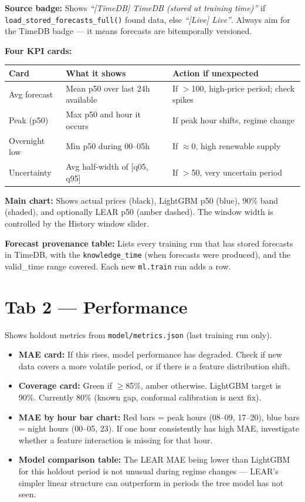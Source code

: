 \documentclass[12pt, a4paper, oneside]{memoir}
\newcommand{\code}[1]{\texttt{\footnotesize #1}}
\begin{document}
\textbf{Source badge:} Shows \emph{``[TimeDB] TimeDB (stored at training time)''} if
\code{load\_stored\_forecasts\_full()} found data, else \emph{``[Live] Live''}. Always aim
for the TimeDB badge --- it means forecasts are bitemporally versioned.

\textbf{Four KPI cards:}
\begin{center}
\begin{tabular}{lll}
\toprule
\textbf{Card} & \textbf{What it shows} & \textbf{Action if unexpected} \\
\midrule
Avg forecast   & Mean p50 over last 24h available & If $>$100, high-price period; check spikes \\
Peak (p50)     & Max p50 and hour it occurs      & If peak hour shifts, regime change \\
Overnight low  & Min p50 during 00--05h          & If $\approx$0, high renewable supply \\
Uncertainty    & Avg half-width of [q05, q95]    & If $>$50, very uncertain period \\
\bottomrule
\end{tabular}
\end{center}

\textbf{Main chart:} Shows actual prices (black), LightGBM p50 (blue), 90\% band
(shaded), and optionally LEAR p50 (amber dashed). The window width is controlled by
the History window slider.

\textbf{Forecast provenance table:} Lists every training run that has stored forecasts
in TimeDB, with the \code{knowledge\_time} (when forecasts were produced), and the
valid\_time range covered. Each new \code{ml.train} run adds a row.

\section{Tab 2 --- Performance}

Shows holdout metrics from \code{model/metrics.json} (last training run only).

\begin{itemize}
  \item \textbf{MAE card:} If this rises, model performance has degraded. Check if new
    data covers a more volatile period, or if there is a feature distribution shift.
  \item \textbf{Coverage card:} Green if $\geq$85\%, amber otherwise. LightGBM target
    is 90\%. Currently 80\% (known gap, conformal calibration is next fix).
  \item \textbf{MAE by hour bar chart:} Red bars = peak hours (08--09, 17--20), blue
    bars = night hours (00--05, 23). If one hour consistently has high MAE, investigate
    whether a feature interaction is missing for that hour.
  \item \textbf{Model comparison table:} The LEAR MAE being lower than LightGBM for this
    holdout period is not unusual during regime changes --- LEAR's simpler linear structure
    can outperform in periods the tree model has not seen.
\end{itemize}
\end{document}
